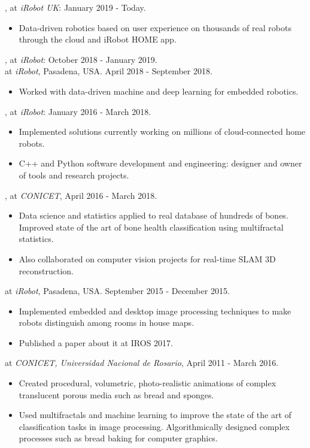 \documentclass[a4paper,10pt]{article}
\begin{document}
, at {\em iRobot UK}: January 2019 - Today.
\begin{itemize}
\item Data-driven robotics based on user experience on thousands of real robots through the cloud and iRobot HOME app.
\end{itemize}

, at {\em iRobot}: October 2018 - January 2019. \\
 at {\em iRobot}, Pasadena, USA. April 2018 - September 2018.
\begin{itemize}
\item Worked with data-driven machine and deep learning for embedded robotics.
\end{itemize}

, at {\em iRobot}: January 2016 - March 2018.
\begin{itemize}
\item Implemented solutions currently working on millions of cloud-connected home robots.
\item C++ and Python software development and engineering: designer and owner of tools and research projects.
\end{itemize}

, at {\em CONICET}, April 2016 - March 2018.
\begin{itemize}
\item Data science and statistics applied to real database of hundreds of bones. Improved state of the art of bone health classification using multifractal statistics.
\item Also collaborated on computer vision projects for real-time SLAM 3D reconstruction.
\end{itemize}

 at {\em iRobot}, Pasadena, USA. September 2015 - December 2015.
\begin{itemize}
\item Implemented embedded and desktop image processing techniques to make robots distinguish among rooms in house maps.
\item Published a paper about it at IROS 2017.
\end{itemize}

 at {\em CONICET, Universidad Nacional de Rosario}, April 2011 - March 2016.
\begin{itemize}
\item Created procedural, volumetric, photo-realistic animations of complex translucent porous media such as bread and sponges.
\item Used multifractals and machine learning to improve the state of the art of classification tasks in image processing. Algorithmically designed complex processes such as bread baking for computer graphics.
\end{itemize}
\end{document}
